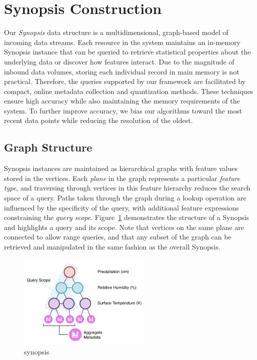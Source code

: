 \section{Synopsis Construction}
\label{sec:synopsis}
Our \emph{Synopsis} data structure is a multidimensional, graph-based model of incoming data streams. Each resource in the system maintains an in-memory Synopsis instance that can be queried to retrieve statistical properties about the underlying data or discover how features interact. Due to the magnitude of inbound data volumes, storing each individual record in main memory is not practical. Therefore, the queries supported by our framework are facilitated by compact, online metadata collection and quantization methods. These techniques ensure high accuracy while also maintaining the memory requirements of the system. To further improve accuracy, we bias our algorithms toward the most recent data points while reducing the resolution of the oldest.

\subsection{Graph Structure}
Synopsis instances are maintained as hierarchical graphs with feature values stored in the vertices. Each \emph{plane} in the graph represents a particular \emph{feature type}, and traversing through vertices in this feature hierarchy reduces the search space of a query. Paths taken through the graph during a lookup operation are influenced by the specificity of the query, with additional feature expressions constraining the \emph{query scope}. Figure~\ref{fig:synopsis} demonstrates the structure of a Synopsis and highlights a query and its scope. Note that vertices on the same plane are connected to allow range queries, and that any subset of the graph can be retrieved and manipulated in the same fashion as the overall Synopsis.

\begin{figure}
    \centerline{\includegraphics[width=2.5in]{figures/synopsis.pdf}}
    \caption{synopsis}
    \label{fig:synopsis}
\end{figure}

